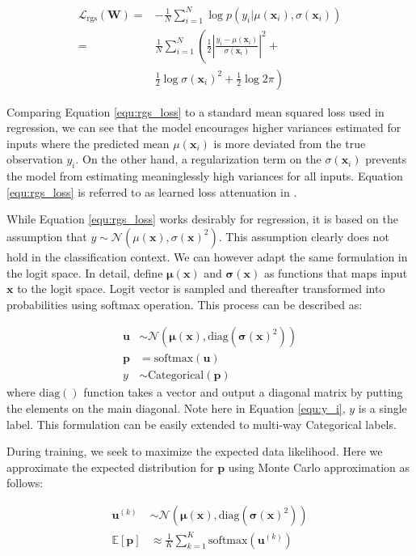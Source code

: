 \documentclass[letterpaper]{article} %
\newcommand{\vect}[1]{\mathbf{#1}}
\newcommand{\matr}[1]{\mathbf{#1}}
\newcommand{\vp}[0]{\vect{p}}
\newcommand{\vu}[0]{\vect{u}}
\newcommand{\vx}[0]{\vect{x}}
\newcommand{\vmu}{\boldsymbol{\mu}}
\newcommand{\vsigma}{\boldsymbol{\sigma}}
\newcommand{\vlb}{\mathcal{L}}
\newcommand{\E}{\mathbb{E}}
\newcommand{\N}{\mathcal{N}}
\newcommand{\mW}[0]{\matr{W}}
\newcommand\diag{\text{diag}}
\newcommand\softmax{\text{softmax}}
\begin{document}
\begin{align}
\label{equ:rgs_loss}
\vlb_{\text{rgs}}(\mW)= & -\frac{1}{N}\sum_{i=1}^N\log{p(y_i|\mu(\vx_i),\sigma(\vx_i))} \nonumber \\
= & \frac{1}{N} \sum_{i=1}^N \left(\frac{1}{2}\left|\frac{y_i-\mu(\vx_i)}{\sigma(\vx_i)}\right|^2 + \right.\nonumber \\
& \left.\frac{1}{2}\log{\sigma(\vx_i)^2} + \frac{1}{2}\log{2\pi}\right)
\end{align}

Comparing Equation \ref{equ:rgs_loss} to a standard mean squared loss used in regression, we can see that the model encourages higher variances estimated for inputs where the predicted mean $\mu(\vx_i)$ is more deviated from the true observation $y_i$. On the other hand, a regularization term on the $\sigma(\vx_i)$ prevents the model from estimating meaninglessly high variances for all inputs. Equation \ref{equ:rgs_loss} is referred to as learned loss attenuation in \cite{kendall2017uncertainties}.

While Equation \ref{equ:rgs_loss} works desirably for regression, it is based on the assumption that $y\sim\N(\mu(\vx), \sigma(\vx)^2)$. This assumption clearly does not hold in the classification context. We can however adapt the same formulation in the logit space. In detail, define $\vmu(\vx)$ and $\vsigma(\vx)$ as functions that maps input $\vx$ to the logit space. Logit vector is sampled and thereafter transformed into probabilities using softmax operation. This process can be described as:

\begin{align}
\vu &\sim \N\left(\vmu(\vx), \diag(\vsigma(\vx)^2)\right) \\
\vp &= \softmax(\vu) \\
y &\sim \text{Categorical}(\vp) \label{equ:y_i}
\end{align}
where $\diag()$ function takes a vector and output a diagonal matrix by putting the elements on the main diagonal. 
Note here in Equation \ref{equ:y_i}, $y$ is a single label. This formulation can be easily extended to multi-way Categorical labels.

During training, we seek to maximize the expected data likelihood. Here we approximate the expected distribution for $\vp$ using Monte Carlo approximation as follows:

\begin{align}
\vu^{(k)}& \sim \N\left(\vmu(\vx), \diag(\vsigma(\vx)^2)\right) \\
\E[\vp]& \approx\frac{1}{K}\sum_{k=1}^K\softmax(\vu^{(k)})
\end{align}
\end{document}
